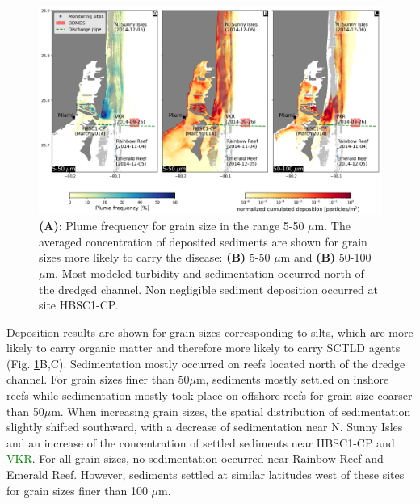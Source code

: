 \documentclass[preprint,12pt,authoryear]{elsarticle}
\newcommand{\modif}[1]{\textcolor{green}{#1}}
\begin{document}
\begin{figure}
	\centering
	\includegraphics[width=\textwidth]{figures/fig2_stokes4.png}
	\caption{\textbf{(A)}: Plume frequency for grain size in the range 5-50 $\mu$m. The averaged concentration of deposited sediments are shown for grain sizes more likely to carry the disease: \textbf{(B)} 5-50 $\mu$m and \textbf{(B)} 50-100 $\mu$m. Most modeled turbidity and sedimentation occurred north of the dredged channel. Non negligible sediment deposition occurred at site HBSC1-CP.}
	\label{fig:onset_depo}
\end{figure}

Deposition results are shown for grain sizes corresponding to silts, which are more likely to carry organic matter and therefore more likely to carry SCTLD agents \citep{erftemeijer2012environmental}(Fig. \ref{fig:onset_depo}B,C). Sedimentation mostly occurred on reefs located north of the dredge channel. For grain sizes finer than 50$\mu$m, sediments mostly settled on inshore reefs while sedimentation mostly took place on offshore reefs for grain size coarser than 50$\mu$m. When increasing grain sizes, the spatial distribution of sedimentation slightly shifted southward, with a decrease of sedimentation near N. Sunny Isles and an increase of the concentration of settled sediments near HBSC1-CP and \modif{VKR}. %
For all grain sizes, no sedimentation occurred near Rainbow Reef and Emerald Reef. However, sediments settled at similar latitudes west of these sites for grain sizes finer than 100 $\mu$m.
\end{document}
